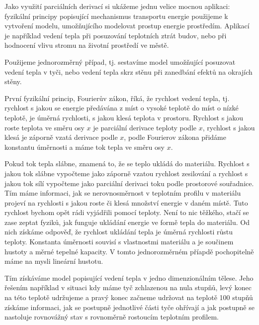 \documentclass[12pt]{article}
\begin{document}
Jako využití parciálních derivací si ukážeme jednu velice mocnou aplikaci: fyzikální principy popisující mechanismus transportu energie použijeme k vytvoření modelu, umožňujícího modelovat prostup energie prostředím. Aplikací je například vedení tepla při posuzování teplotních ztrát budov, nebo při hodnocení vlivu stromu na životní prostředí ve městě.

Použijeme jednorozměrný případ, tj. sestavíme model umožňující posuzovat vedení tepla v tyči, nebo vedení tepla skrz stěnu při zanedbání efektů na okrajích stěny. 

První fyzikální princip, Fourierův zákon, říká, že rychlost vedení tepla, tj. rychlost s jakou se energie předávána z míst o vysoké teplotě do míst o nízké teplotě, je úměrná rychlosti, s jakou klesá teplota v prostoru. Rychlost s jakou roste teplota ve směru osy $x$ je parciální derivace teploty podle $x$, rychlost s jakou klesá je záporně vzatá derivace podle $x$, podle Fourierov zákona přidáme konstantu úměrnosti a máme tok tepla ve směru osy $x$.

Pokud tok tepla slábne, znamená to, že se teplo ukládá do materiálu. Rychlost s jakou tok slábne vypočteme jako záporně vzatou rychlost zesilování a rychlost s jakou tok sílí vypočteme jako parciální derivaci toku podle prostorové souřadnice. Tím máme informaci, jak se nerovnosměrnost v teplotním profilu v materiálu projeví na rychlosti s jakou roste či klesá množství energie v daném místě. Tuto rychlost bychom opět rádi vyjádřili pomocí teploty. Není to nic těžkého, stačí se zase zeptat fyziků, jak funguje ukládání energie ve formě tepla do materiálu. Od nich získáme odpověď, že rychlost ukládání tepla je úměrná rychlosti růstu teploty. Konstanta úměrnosti souvisí s vlastnostmi materiálu a je součinem hustoty a měrné tepelné kapacity. V tomto jednorozměrném příapdě pochopitelně máme na mysli lineární hustotu. 

Tím získáváme model popisující vedení tepla v jedno dimenzionálním tělese. Jeho řešením například v situaci kdy máme tyč zchlazenou na nula stupňů, levý konec na této teplotě udržujeme a pravý konec začneme udržovat na teplotě 100 stupňů získáme informaci, jak se postupně jednotlivé části tyče ohřívají a jak postupně se nastoluje rovnovážný stav s rovnoměrně rostoucím teplotním profilem.
\end{document}
